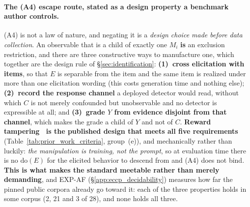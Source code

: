 \paragraph{The (A4) escape route, stated as a design property a benchmark author controls.} (A4) is not a law of nature, and negating it is a \emph{design choice made before data collection}. An observable that is a child of exactly one $M_i$ \textbf{is} an exclusion restriction, and there are three constructive ways to manufacture one, which together are the design rule of §\ref{sec:identification}: \textbf{(1)~cross elicitation with items}, so that $E$ is separable from the item and the same item is realized under more than one elicitation wording (this costs generation time and nothing else); \textbf{(2)~record the response channel} a deployed detector would read, without which $C$ is not merely confounded but unobservable and no detector is expressible at all; and \textbf{(3)~grade $Y$ from evidence disjoint from that channel}, which makes the grade a child of $Y$ and not of $C$. \textbf{Reward tampering~\citep{denison2024sycophancy} is the published design that meets all five requirements} (Table~\ref{tab:prior_work_criteria}, group~(e)), and mechanically rather than luckily: \emph{the manipulation is training, not the prompt}, so at evaluation time there is no $\mathrm{do}(E)$ for the elicited behavior to descend from and (A4) does not bind. \textbf{This is what makes the standard meetable rather than merely demanding}, and EXP-AF (§\ref{app:eccp_decidability}) measures how far the pinned public corpora already go toward it: each of the three properties holds in some corpus (2, 21 and 3 of 28), and none holds all three.

